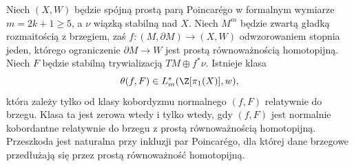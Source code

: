 \begin{twierdzenie}
\label{thm:wall-odd-22}
Niech $(X,W)$ będzie spójną prostą parą Poincarégo
w formalnym wymiarze $m=2k+1\geq5$, a $\nu$ wiązką
stabilną nad $X$. Niech $M^m$ będzie zwartą gładką
rozmaitością z brzegiem, zaś
$f:(M,\partial M)\to(X,W)$ odwzorowaniem stopnia
jeden, którego ograniczenie
$\partial M\to W$ jest prostą równoważnością
homotopijną. Niech $F$ będzie stabilną
trywializacją $TM\oplus f^*\nu$.
Istnieje klasa
\[
 \theta(f,F)\in L^s_m(\Z[\pi_1(X)],w),
\]
która zależy tylko od klasy kobordyzmu normalnego
$(f,F)$ relatywnie do brzegu. Klasa ta jest zerowa
wtedy i tylko wtedy, gdy $(f,F)$ jest normalnie
kobordantne relatywnie do brzegu z prostą
równoważnością homotopijną. Przeszkoda jest
naturalna przy inkluzji par Poincarégo, dla której
dane brzegowe przedłużają się przez prostą
równoważność homotopijną.
\end{twierdzenie}

